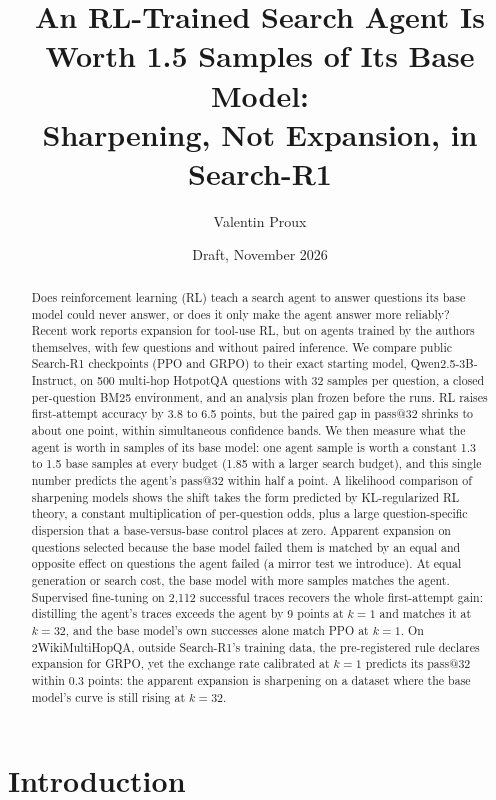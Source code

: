 \documentclass[11pt]{article}
\title{An RL-Trained Search Agent Is Worth 1.5 Samples of Its Base Model:\\
Sharpening, Not Expansion, in Search-R1}
\author{Valentin Proux}
\date{Draft, November 2026}
\begin{document}
\maketitle

\begin{abstract}
Does reinforcement learning (RL) teach a search agent to answer questions its base model could never answer, or does it only make the agent answer more reliably? Recent work reports expansion for tool-use RL, but on agents trained by the authors themselves, with few questions and without paired inference. We compare public Search-R1 checkpoints (PPO and GRPO) to their exact starting model, Qwen2.5-3B-Instruct, on 500 multi-hop HotpotQA questions with 32 samples per question, a closed per-question BM25 environment, and an analysis plan frozen before the runs. RL raises first-attempt accuracy by 3.8 to 6.5 points, but the paired gap in pass@32 shrinks to about one point, within simultaneous confidence bands. We then measure what the agent is worth in samples of its base model: one agent sample is worth a constant 1.3 to 1.5 base samples at every budget (1.85 with a larger search budget), and this single number predicts the agent's pass@32 within half a point. A likelihood comparison of sharpening models shows the shift takes the form predicted by KL-regularized RL theory, a constant multiplication of per-question odds, plus a large question-specific dispersion that a base-versus-base control places at zero. Apparent expansion on questions selected because the base model failed them is matched by an equal and opposite effect on questions the agent failed (a mirror test we introduce). At equal generation or search cost, the base model with more samples matches the agent. Supervised fine-tuning on 2{,}112 successful traces recovers the whole first-attempt gain: distilling the agent's traces exceeds the agent by 9 points at $k = 1$ and matches it at $k = 32$, and the base model's own successes alone match PPO at $k = 1$. On 2WikiMultiHopQA, outside Search-R1's training data, the pre-registered rule declares expansion for GRPO, yet the exchange rate calibrated at $k = 1$ predicts its pass@32 within 0.3 points: the apparent expansion is sharpening on a dataset where the base model's curve is still rising at $k = 32$.
\end{abstract}

\section{Introduction}
\end{document}
